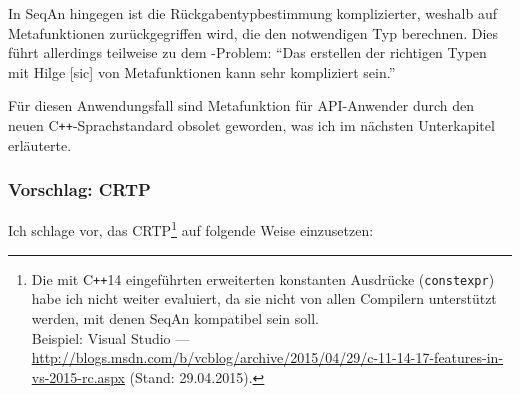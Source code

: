 In SeqAn hingegen ist die Rückgabentypbestimmung komplizierter, weshalb auf Metafunktionen zurückgegriffen wird, die den notwendigen Typ berechnen. Dies führt allerdings teilweise zu dem -Problem: ``Das erstellen der richtigen Typen mit Hilge [sic] von Metafunktionen kann sehr kompliziert sein.''

Für diesen Anwendungsfall sind Metafunktion für API-Anwender durch den neuen C\texttt{++}-Sprachstandard obsolet geworden, was ich im nächsten Unterkapitel erläuterte.



\subsubsection{Vorschlag: CRTP}

Ich schlage vor, das CRTP\footnote{Die mit C\texttt{++}14 eingeführten erweiterten konstanten Ausdrücke (\texttt{constexpr}) habe ich nicht weiter evaluiert, da sie nicht von allen Compilern unterstützt werden, mit denen SeqAn kompatibel sein soll. \\Beispiel: Visual Studio --- \url{http://blogs.msdn.com/b/vcblog/archive/2015/04/29/c-11-14-17-features-in-vs-2015-rc.aspx} (Stand: 29.04.2015).} auf folgende Weise einzusetzen:

